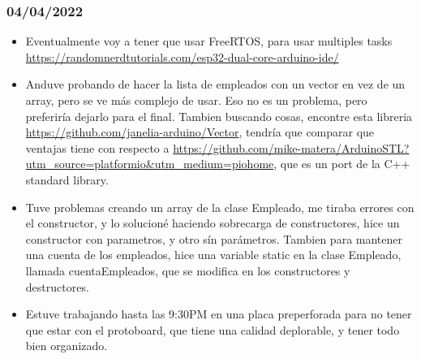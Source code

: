 \documentclass[../informe_krapp.tex]{subfiles}
\begin{document}
\subsubsection{04/04/2022}
\begin{itemize}
	\item Eventualmente voy a tener que usar FreeRTOS, para usar multiples tasks
	      \url{https://randomnerdtutorials.com/esp32-dual-core-arduino-ide/}
	\item Anduve probando de hacer la lista de empleados con un vector en vez
	      de un array, pero se ve más complejo de usar. Eso no es un problema, pero preferiría
	      dejarlo para el final. Tambien buscando cosas, encontre esta libreria
	      \url{https://github.com/janelia-arduino/Vector}, tendría que comparar que ventajas
	      tiene con respecto a
	      \url{https://github.com/mike-matera/ArduinoSTL?utm_source=platformio&utm_medium=piohome},
	      que es un port de la C++ standard library.
	\item Tuve problemas creando un array de la clase Empleado, me tiraba errores
	      con el constructor, y lo solucioné haciendo sobrecarga de constructores, hice
	      un constructor con parametros, y otro sín parámetros.
	      Tambien para mantener una cuenta de los empleados, hice una variable static
	      en la clase Empleado, llamada cuentaEmpleados, que se modifica en los constructores
	      y destructores.
	\item Estuve trabajando hasta las 9:30PM en una placa preperforada
	      para no tener que estar con el protoboard, que tiene una calidad deplorable,
	      y tener todo bien organizado. 
\end{itemize}
\end{document}
